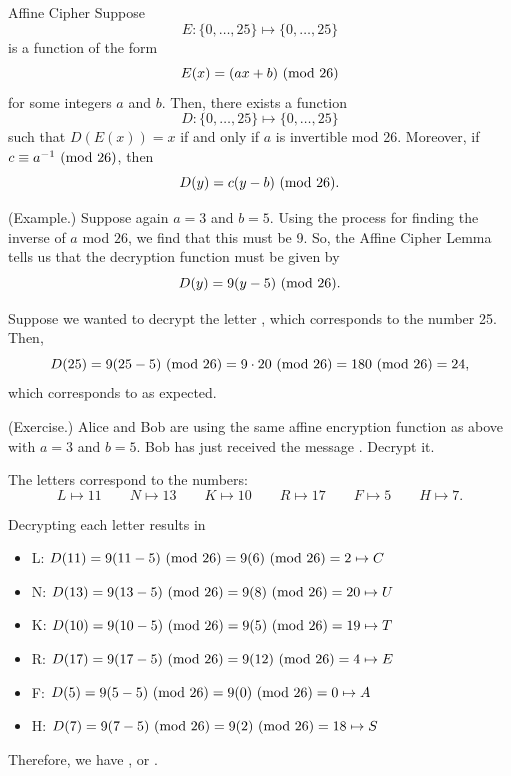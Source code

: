\documentclass[letterpaper]{article}
\begin{document}
\begin{lemma}{Affine Cipher}{}
    Suppose \[E: \{0, \hdots, 25\} \mapsto \{0, \hdots, 25\}\] is a function of the form \[E(x) = (ax + b) \ (\mathrm{mod}\ 26)\] for some integers $a$ and $b$. Then, there exists a function \[D: \{0, \hdots, 25\} \mapsto \{0, \hdots, 25\}\] such that $D(E(x)) = x$ if and only if $a$ is invertible mod 26. Moreover, if $c \equiv a^{-1} \ (\mathrm{mod}\ 26)$, then \[D(y) = c(y - b) \ (\mathrm{mod}\ 26).\]
\end{lemma}

\begin{mdframed}
    (Example.) Suppose again $a = 3$ and $b = 5$. Using the process for finding the inverse of $a$ mod $26$, we find that this must be 9. So, the Affine Cipher Lemma tells us that the decryption function must be given by \[D(y) = 9(y - 5) \ (\mathrm{mod}\ 26).\] 

    Suppose we wanted to decrypt the letter , which corresponds to the number 25. Then, 
    \[D(25) = 9(25 - 5) \ (\mathrm{mod}\ 26) = 9 \cdot 20 \ (\mathrm{mod}\ 26) = 180 \ (\mathrm{mod}\ 26) = 24,\] which corresponds to  as expected.
\end{mdframed}

\begin{mdframed}
    (Exercise.) Alice and Bob are using the same affine encryption function as above with $a = 3$ and $b = 5$. Bob has just received the message . Decrypt it.
    
    \begin{mdframed}
        The letters correspond to the numbers: 
        \[L \mapsto 11 \qquad N \mapsto 13 \qquad K \mapsto 10 \qquad R \mapsto 17 \qquad F \mapsto 5 \qquad H \mapsto 7.\]

        Decrypting each letter results in 
        \begin{itemize}
            \item L: $D(11) = 9(11 - 5) \ (\mathrm{mod}\ 26) = 9(6) \ (\mathrm{mod}\ 26) = 2 \mapsto C$
            \item N: $D(13) = 9(13 - 5) \ (\mathrm{mod}\ 26) = 9(8) \ (\mathrm{mod}\ 26) = 20 \mapsto U$
            \item K: $D(10) = 9(10 - 5) \ (\mathrm{mod}\ 26) = 9(5) \ (\mathrm{mod}\ 26) = 19 \mapsto T$
            \item R: $D(17) = 9(17 - 5) \ (\mathrm{mod}\ 26) = 9(12) \ (\mathrm{mod}\ 26) = 4 \mapsto E$
            \item F: $D(5) = 9(5 - 5) \ (\mathrm{mod}\ 26) = 9(0) \ (\mathrm{mod}\ 26) = 0 \mapsto A$
            \item H: $D(7) = 9(7 - 5) \ (\mathrm{mod}\ 26) = 9(2) \ (\mathrm{mod}\ 26) = 18 \mapsto S$
        \end{itemize}
        Therefore, we have , or \textbf{}.
    \end{mdframed}
\end{mdframed}
\end{document}
